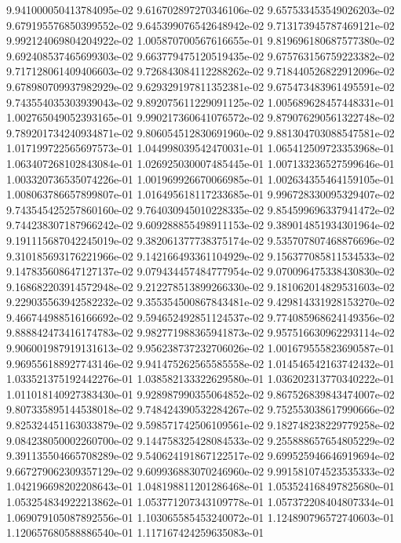 9.941000050413784095e-02
9.616702897270346106e-02
9.657533453549026203e-02
9.679195576850399552e-02
9.645399076542648942e-02
9.713173945787469121e-02
9.992124069804204922e-02
1.005870700567616655e-01
9.819696180687577380e-02
9.692408537465699303e-02
9.663779475120519435e-02
9.675763156759223382e-02
9.717128061409406603e-02
9.726843084112288262e-02
9.718440526822912096e-02
9.678980709937982929e-02
9.629329197811352381e-02
9.675473483961495591e-02
9.743554035303939043e-02
9.892075611229091125e-02
1.005689628457448331e-01
1.002765049052393165e-01
9.990217360641076572e-02
9.879076290561322748e-02
9.789201734240934871e-02
9.806054512830691960e-02
9.881304703088547581e-02
1.017199722565697573e-01
1.044998039542470031e-01
1.065412509723353968e-01
1.063407268102843084e-01
1.026925030007485445e-01
1.007133236527599646e-01
1.003320736535074226e-01
1.001969926670066985e-01
1.002634355464159105e-01
1.008063786657899807e-01
1.016495618117233685e-01
9.996728330095329407e-02
9.743545425257860160e-02
9.764030945010228335e-02
9.854599696337941472e-02
9.744238307187966242e-02
9.609288855498911153e-02
9.389014851934301964e-02
9.191115687042245019e-02
9.382061377738375174e-02
9.535707807468876696e-02
9.310185693176221966e-02
9.142166493361104929e-02
9.156377085811534533e-02
9.147835608647127137e-02
9.079434457484777954e-02
9.070096475338430830e-02
9.168682203914572948e-02
9.212278513899266330e-02
9.181062014829531603e-02
9.229035563942582232e-02
9.355354500867843481e-02
9.429814331928153270e-02
9.466744988516166692e-02
9.594652492851124537e-02
9.774085968624149356e-02
9.888842473416174783e-02
9.982771988365941873e-02
9.957516630962293114e-02
9.906001987919131613e-02
9.956238737232706026e-02
1.001679555823690587e-01
9.969556188927743146e-02
9.941475262565585558e-02
1.014546542163742432e-01
1.033521375192442276e-01
1.038582133322629580e-01
1.036202313770340222e-01
1.011018140927383430e-01
9.928987990355064852e-02
9.867526839843474007e-02
9.807335895144538018e-02
9.748424390532284267e-02
9.752553038617990666e-02
9.825324451163033879e-02
9.598571742506109561e-02
9.182748238229779258e-02
9.084238050002260700e-02
9.144758325428084533e-02
9.255888657654805229e-02
9.391135504665708289e-02
9.540624191867122517e-02
9.699525946646919694e-02
9.667279062309357129e-02
9.609936883070246960e-02
9.991581074523535333e-02
1.042196698202208643e-01
1.048198811201286468e-01
1.053524168497825680e-01
1.053254834922213862e-01
1.053771207343109778e-01
1.057372208404807334e-01
1.069079105087892556e-01
1.103065585453240072e-01
1.124890796572740603e-01
1.120657680588886540e-01
1.117167424259635083e-01
